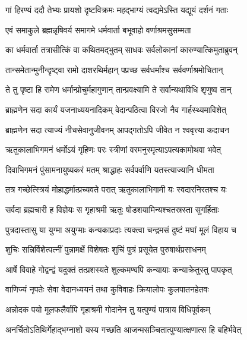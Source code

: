 \twolineshloka
{गां हिरण्यं ददौ तेभ्यः प्रायशो दृष्टविक्रमः}
{महद्भाग्यं त्वद्यमेऽस्ति यद्यूयं दर्शनं गताः}%


\twolineshloka
{एवं समाकुले ब्रह्मन्नृषिवर्य समागमे}
{धर्मवार्ता बभूवाहो वर्णाश्रमसुसम्मता}%


\twolineshloka
{का धर्मवार्ता तत्रासीत्किं वा कथितमद्भुतम्}
{साधवः सर्वलोकानां कारुण्यात्किमुताब्रुवन्}%


\twolineshloka
{तान्समेतान्मुनीन्दृष्ट्वा रामो दाशरथिर्महान्}
{पप्रच्छ सर्वधर्मांश्च सर्ववर्णाश्रमोचितान्}%

\twolineshloka
{ते तु पृष्टा हि रामेण धर्मान्प्रोचुर्महागुणान्}
{तान्प्रवक्ष्यामि ते सर्वान्यथाविधि शृणुष्व तान्}%


\twolineshloka
{ब्राह्मणेन सदा कार्यं यजनाध्ययनादिकम्}
{वेदान्पठित्वा विरजो नैव गार्हस्थ्यमाविशेत्}%

\twolineshloka
{ब्राह्मणेन सदा त्याज्यं नीचसेवानुजीवनम्}
{आपद्गतोऽपि जीवेत न श्ववृत्त्या कदाचन}%

\twolineshloka
{ऋतुकालाभिगमनं धर्मोऽयं गृहिणः परः}
{स्त्रीणां वरमनुस्मृत्याऽपत्यकामोथवा भवेत्}%

\twolineshloka
{दिवाभिगमनं पुंसामनायुष्यकरं मतम्}
{श्राद्धाहः सर्वपर्वाणि यतस्त्याज्यानि धीमता}%

\twolineshloka
{तत्र गच्छेत्स्त्रियं मोहाद्धर्मात्प्रच्यवते परात्}
{ऋतुकालाभिगामी यः स्वदारनिरतश्च यः}%

\twolineshloka
{सर्वदा ब्रह्मचारी ह विज्ञेयः स गृहाश्रमी}
{ऋतुः षोडशयामिन्यश्चतस्रस्ता सुगर्हिताः}%

\twolineshloka
{पुत्रदास्तासु या युग्मा अयुग्माः कन्यकाप्रदाः}
{त्यक्त्वा चन्द्रमसं दुष्टं मघां मूलं विहाय च}%

\twolineshloka
{शुचिः सन्निर्विशेत्पत्नीं पुन्नामर्क्षे विशेषतः}
{शुचिं पुत्रं प्रसूयेत पुरुषार्थप्रसाधनम्}%

\twolineshloka
{आर्षे विवाहे गोद्वन्द्वं यदुक्तं तत्प्रशस्यते}
{शुल्कमण्वपि कन्यायाः कन्याक्रेतुस्तु पापकृत्}%

\twolineshloka
{वाणिज्यं नृपतेः सेवा वेदानध्ययनं तथा}
{कुविवाहः क्रियालोपः कुलपातनहेतवः}%

\twolineshloka
{अन्नोदक पयो मूलफलैर्वापि गृहाश्रमी}
{गोदानेन तु यत्पुण्यं पात्राय विधिपूर्वकम्}%

\twolineshloka
{अनर्चितोऽतिथिर्गेहाद्भग्नाशो यस्य गच्छति}
{आजन्मसञ्चितात्पुण्यात्क्षणात्स हि बहिर्भवेत्}%

